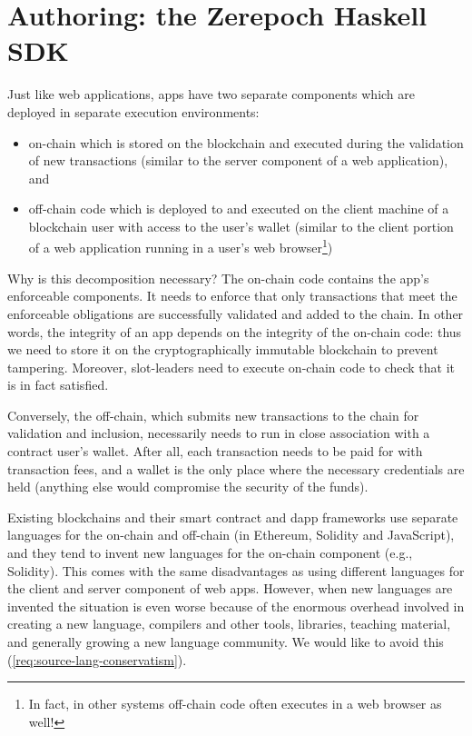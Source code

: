\section{Authoring: the Zerepoch Haskell SDK}
\label{sec:sdk}

Just like web applications, \glspl{app} have two separate components which are deployed in separate execution environments:
\begin{itemize}
\item \gls{on-chain} which is stored on the blockchain and executed during the validation of new transactions (similar to the server component of a web application), and
\item \gls{off-chain} code which is deployed to and executed on the client machine of a blockchain user with access to the user’s wallet (similar to the client portion of a web application running in a user’s web browser\footnote{
In fact, in other systems off-chain code often executes in a web browser as well!
})
\end{itemize}

Why is this decomposition necessary? The on-chain code contains the \gls{app}'s enforceable components.
It needs to enforce that only transactions that meet the enforceable obligations are successfully validated and added to the chain.
In other words, the integrity of an \gls{app} depends on the integrity of the on-chain code: thus we need to store it on the cryptographically immutable blockchain to prevent tampering.
Moreover, \glspl{slot-leader} need to execute on-chain code to check that it is in fact satisfied.

Conversely, the \gls{off-chain}, which submits new transactions to the chain for validation and inclusion, necessarily needs to run in close association with a contract user’s wallet.
After all, each transaction needs to be paid for with transaction fees, and a wallet is the only place where the necessary credentials are held (anything else would compromise the security of the funds).

Existing blockchains and their smart contract and dapp frameworks use separate languages for the \gls{on-chain} and \gls{off-chain} (in Ethereum, Solidity and JavaScript), and they tend to invent new languages for the on-chain component (e.g., Solidity).
This comes with the same disadvantages as using different languages for the client and server component of web apps.
However, when new languages are invented the situation is even worse because of the enormous overhead involved in creating a new language, compilers and other tools, libraries, teaching material, and generally growing a new language community. We would like to avoid this (\cref{req:source-lang-conservatism}).

